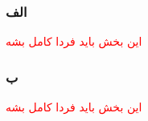 \subsubsection*{الف}
\textcolor{red}{این بخش باید فردا کامل بشه}
\subsubsection*{ب}
\textcolor{red}{این بخش باید فردا کامل بشه}